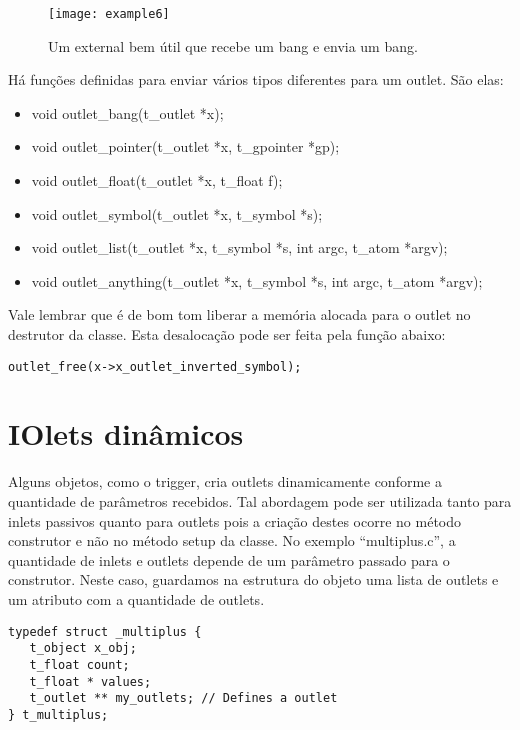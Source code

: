 \begin{figure}[h!]
\centering
\texttt{[image: example6]}
\caption{Um external bem útil que recebe um bang e envia um bang.}
\label{fig:outlet-bang}
\end{figure}

Há funções definidas para enviar vários tipos diferentes para um outlet.
São elas:

\begin{itemize}
\item void outlet\_bang(t\_outlet *x);
\item void outlet\_pointer(t\_outlet *x, t\_gpointer *gp);
\item void outlet\_float(t\_outlet *x, t\_float f);
\item void outlet\_symbol(t\_outlet *x, t\_symbol *s);
\item void outlet\_list(t\_outlet *x, t\_symbol *s, int argc, t\_atom *argv);
\item void outlet\_anything(t\_outlet *x, t\_symbol *s, int argc, t\_atom *argv);
\end{itemize}

Vale lembrar que é de bom tom liberar a memória alocada para o outlet no destrutor
da classe.
Esta desalocação pode ser feita pela função abaixo:

\begin{lstlisting}[caption=Desalocando a memória]
   outlet_free(x->x_outlet_inverted_symbol);
\end{lstlisting}

\section{IOlets dinâmicos}
Alguns objetos, como o trigger, cria outlets dinamicamente conforme a quantidade
de parâmetros recebidos.
Tal abordagem pode ser utilizada tanto para inlets passivos quanto para outlets
pois a criação destes ocorre no método construtor e não no método setup da
classe.
No exemplo ``multiplus.c'', a quantidade de inlets e outlets depende de um
parâmetro passado para o construtor.
Neste caso, guardamos na estrutura do objeto uma lista de outlets e um atributo
com a quantidade de outlets.

\begin{lstlisting}[caption=Estrutura de um objeto com outlets dinâmicos]
typedef struct _multiplus {
   t_object x_obj;
   t_float count;
   t_float * values;
   t_outlet ** my_outlets; // Defines a outlet
} t_multiplus;
\end{lstlisting}

